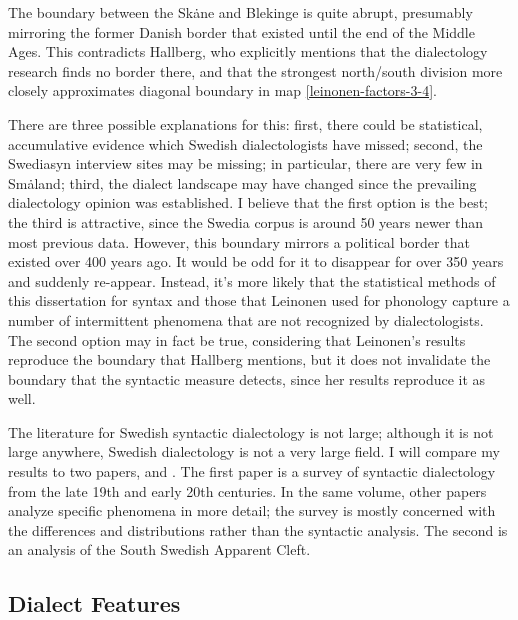 The boundary between the Sk\.ane and Blekinge is quite abrupt,
presumably mirroring the former Danish border that existed until the
end of the Middle Ages. This contradicts Hallberg, who explicitly
mentions that the dialectology research finds no border there, and
that the strongest north/south division more closely approximates
 diagonal boundary in map
\ref{leinonen-factors-3-4}.

There are three possible explanations for this: first, there could be
statistical, accumulative evidence which Swedish dialectologists have
missed; second, the Swediasyn interview sites may be missing; in
particular, there are very few in Sm\.aland; third, the dialect
landscape may have changed since the prevailing dialectology opinion
was established. I believe that the first option is the best; the
third is attractive, since the Swedia corpus is around 50 years newer
than most previous data. However, this boundary mirrors a political
border that existed over 400 years ago. It would be odd for it to
disappear for over 350 years and suddenly re-appear. Instead, it's
more likely that the statistical methods of this dissertation for
syntax and those that Leinonen used for phonology capture a number of
intermittent phenomena that are not recognized by dialectologists.
The second option may in fact be true, considering that Leinonen's
results reproduce the boundary that Hallberg mentions, but it does not
invalidate the boundary that the syntactic measure detects, since her
results reproduce it as well.


The literature for Swedish syntactic dialectology is not large;
although it is not large anywhere, Swedish dialectology is not a very
large field. I will compare my results to two papers,
 and . The first paper is a
survey of syntactic dialectology from the late 19th and early 20th
centuries. In the same volume, other papers analyze specific phenomena
in more detail; the survey is mostly concerned with the differences
and distributions rather than the syntactic analysis. The second
is an analysis of the South Swedish Apparent Cleft.

\subsection{Dialect Features}

